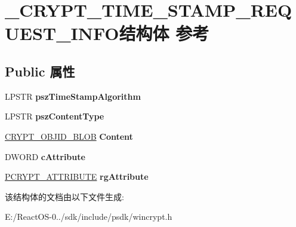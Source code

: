 \hypertarget{struct___c_r_y_p_t___t_i_m_e___s_t_a_m_p___r_e_q_u_e_s_t___i_n_f_o}{}\section{\+\_\+\+C\+R\+Y\+P\+T\+\_\+\+T\+I\+M\+E\+\_\+\+S\+T\+A\+M\+P\+\_\+\+R\+E\+Q\+U\+E\+S\+T\+\_\+\+I\+N\+F\+O结构体 参考}
\label{struct___c_r_y_p_t___t_i_m_e___s_t_a_m_p___r_e_q_u_e_s_t___i_n_f_o}
\subsection*{Public 属性}
\begin{DoxyCompactItemize}
\item 
\mbox{\label{struct___c_r_y_p_t___t_i_m_e___s_t_a_m_p___r_e_q_u_e_s_t___i_n_f_o_ae69b2a66ebae72d014f75f0ed69bb04e}} 
L\+P\+S\+TR {\bfseries psz\+Time\+Stamp\+Algorithm}
\item 
\mbox{\label{struct___c_r_y_p_t___t_i_m_e___s_t_a_m_p___r_e_q_u_e_s_t___i_n_f_o_aa81a87923d4b388cf25dd8a5487e19b5}} 
L\+P\+S\+TR {\bfseries psz\+Content\+Type}
\item 
\mbox{\label{struct___c_r_y_p_t___t_i_m_e___s_t_a_m_p___r_e_q_u_e_s_t___i_n_f_o_a77ffc10599d1eddf8cc62f55724c288c}} 
\hyperlink{struct___c_r_y_p_t_o_a_p_i___b_l_o_b}{C\+R\+Y\+P\+T\+\_\+\+O\+B\+J\+I\+D\+\_\+\+B\+L\+OB} {\bfseries Content}
\item 
\mbox{\label{struct___c_r_y_p_t___t_i_m_e___s_t_a_m_p___r_e_q_u_e_s_t___i_n_f_o_ac258cd22d34ff91ff21f7cc0aac8a7b1}} 
D\+W\+O\+RD {\bfseries c\+Attribute}
\item 
\mbox{\label{struct___c_r_y_p_t___t_i_m_e___s_t_a_m_p___r_e_q_u_e_s_t___i_n_f_o_a26556a56b05e04a4a99ebfb8a99c0d84}} 
\hyperlink{struct___c_r_y_p_t___a_t_t_r_i_b_u_t_e}{P\+C\+R\+Y\+P\+T\+\_\+\+A\+T\+T\+R\+I\+B\+U\+TE} {\bfseries rg\+Attribute}
\end{DoxyCompactItemize}


该结构体的文档由以下文件生成\+:\begin{DoxyCompactItemize}
\item 
E\+:/\+React\+O\+S-\/0../sdk/include/psdk/wincrypt.\+h\end{DoxyCompactItemize}
